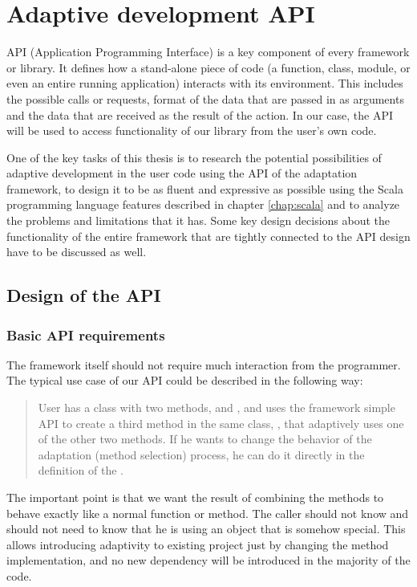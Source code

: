 \chapter{Adaptive development API}
\label{chapter:api}

API (Application Programming Interface) is a key component of every framework or library. It defines how a stand-alone piece of code (a function, class, module, or even an entire running application) interacts with its environment. This includes the possible calls or requests, format of the data that are passed in as arguments and the data that are received as the result of the action. In our case, the API will be used to access functionality of our library from the user's own code.

One of the key tasks of this thesis is to research the potential possibilities of adaptive development in the user code using the API of the adaptation framework, to design it to be as fluent and expressive as possible using the Scala programming language features described in chapter \ref{chap:scala} and to analyze the problems and limitations that it has. 
Some key design decisions about the functionality of the entire framework that are tightly connected to the API design have to be discussed as well.

\section{Design of the API}

\subsection{Basic API requirements}

The framework itself should not require much interaction from the programmer. The typical use case of our API could be described in the following way:

\blockquote{
User has a class with two methods,  and  , and uses the framework simple API to create a third method in the same class, , that adaptively uses one of the other two methods. If he wants to change the behavior of the adaptation (method selection) process, he can do it directly in the definition of the .
}

The important point is that we want the result of combining the methods to behave exactly like a normal function or method. The caller should not know and should not need to know that he is using an object that is somehow special. This allows introducing adaptivity to existing project just by changing the method implementation, and no new dependency will be introduced in the majority of the code.

